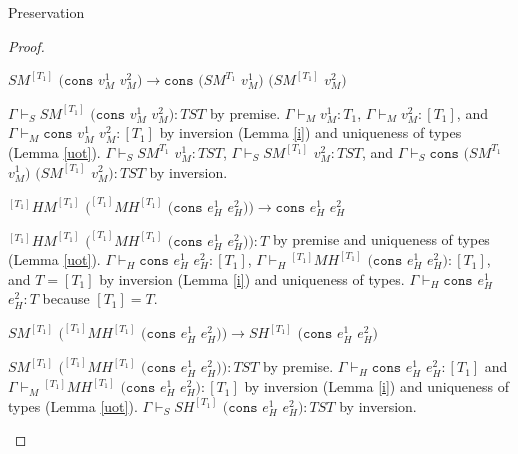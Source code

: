 \begin{theorem}{Preservation}
\begin{proof}

\begin{case}
$SM^{[T_{1}]}$ $(\mathtt{cons}$ $v_{M}^{1}$ $v_{M}^{2})\rightarrow\mathtt{cons}$ $(SM^{T_{1}}$ $v_{M}^{1})$ $(SM^{[T_{1}]}$ $v_{M}^{2})$

$\Gamma\vdash_{S}SM^{[T_{1}]}$ $(\mathtt{cons}$ $v_{M}^{1}$ $v_{M}^{2}):TST$ by premise.  $\Gamma\vdash_{M}v_{M}^{1}:T_{1}$, $\Gamma\vdash_{M}v_{M}^{2}:[T_{1}]$, and $\Gamma\vdash_{M}\mathtt{cons}$ $v_{M}^{1}$ $v_{M}^{2}:[T_{1}]$ by inversion (Lemma \ref{i}) and uniqueness of types (Lemma \ref{uot}).  $\Gamma\vdash_{S}SM^{T_{1}}$ $v_{M}^{1}:TST$, $\Gamma\vdash_{S}SM^{[T_{1}]}$ $v_{M}^{2}:TST$, and $\Gamma\vdash_{S}\mathtt{cons}$ $(SM^{T_{1}}$ $v_{M}^{1})$ $(SM^{[T_{1}]}$ $v_{M}^{2}):TST$ by inversion.
\end{case}


\begin{case}
$^{[T_{1}]}HM^{[T_{1}]}$ $(^{[T_{1}]}MH^{[T_{1}]}$ $(\mathtt{cons}$ $e_{H}^{1}$ $e_{H}^{2}))\rightarrow\mathtt{cons}$ $e_{H}^{1}$ $e_{H}^{2}$

$^{[T_{1}]}HM^{[T_{1}]}$ $(^{[T_{1}]}MH^{[T_{1}]}$ $(\mathtt{cons}$ $e_{H}^{1}$ $e_{H}^{2})):T$ by premise and uniqueness of types (Lemma \ref{uot}).  $\Gamma\vdash_{H}\mathtt{cons}$ $e_{H}^{1}$ $e_{H}^{2}:[T_{1}]$, $\Gamma\vdash_{H}{^{[T_{1}]}M}H^{[T_{1}]}$ $(\mathtt{cons}$ $e_{H}^{1}$ $e_{H}^{2}):[T_{1}]$, and $T=[T_{1}]$ by inversion (Lemma \ref{i}) and uniqueness of types.  $\Gamma\vdash_{H}\mathtt{cons}$ $e_{H}^{1}$ $e_{H}^{2}:T$ because $[T_{1}]=T$.
\end{case}


\begin{case}
$SM^{[T_{1}]}$ $(^{[T_{1}]}MH^{[T_{1}]}$ $(\mathtt{cons}$ $e_{H}^{1}$ $e_{H}^{2}))\rightarrow SH^{[T_{1}]}$ $(\mathtt{cons}$ $e_{H}^{1}$ $e_{H}^{2})$

$SM^{[T_{1}]}$ $(^{[T_{1}]}MH^{[T_{1}]}$ $(\mathtt{cons}$ $e_{H}^{1}$ $e_{H}^{2})):TST$ by premise.  $\Gamma\vdash_{H}\mathtt{cons}$ $e_{H}^{1}$ $e_{H}^{2}:[T_{1}]$ and $\Gamma\vdash_{M}{^{[T_{1}]}M}H^{[T_{1}]}$ $(\mathtt{cons}$ $e_{H}^{1}$ $e_{H}^{2}):[T_{1}]$ by inversion (Lemma \ref{i}) and uniqueness of types (Lemma \ref{uot}).  $\Gamma\vdash_{S}SH^{[T_{1}]}$ $(\mathtt{cons}$ $e_{H}^{1}$ $e_{H}^{2}):TST$ by inversion.
\end{case}



\end{proof}
\end{theorem}
